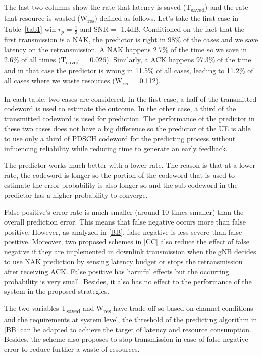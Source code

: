 \documentclass[conference]{IEEEtran}
\begin{document}
The last two columns show the rate that latency is saved (T\textsubscript{saved}) and the rate that resource is wasted (W\textsubscript{res}) defined as follows. Let's take the first case in Table~\ref{tab1} wih $r_{p}$ = $\frac{1}{3}$ and SNR = -1.4dB. Conditioned on the fact that the first transmission is a NAK, the predictor is right in 98\% of the cases and we save latency on the retransmission. A NAK happens 2.7\% of the time so we save in 2.6\% of all times (T\textsubscript{saved} = 0.026). Similarly, a ACK happens 97.3\% of the time and in that case the predictor is wrong in 11.5\% of all cases, leading to 11.2\% of all cases where we waste resources (W\textsubscript{res} = 0.112).

In each table, two cases are considered. In the first case, a half of the transmitted codeword is used to estimate the outcome. In the other case, a third of the transmitted codeword is used for prediction. The performance of the predictor in these two cases does not have a big difference so the predictor of the UE is able to use only a third of PDSCH codeword for the predicting process without influencing reliability while reducing time to generate an early feedback.

The predictor works much better with a lower rate. The reason is that at a lower rate, the codeword is longer so the portion of the codeword that is used to estimate the error probability is also longer so and the sub-codeword in the predictor has a higher probability to converge.

False positive's error rate is much smaller (around 10 times smaller) than the overall prediction error. This means that false negative occurs more than false positive. However, as analyzed in \ref{BB}, false negative is less severe than false positive. Moreover, two proposed schemes in \ref{CC} also reduce the effect of false negative if they are implemented in downlink transmission when the gNB decides to use NAK prediction by sensing latency budget or stops the retransmission after receiving ACK. False positive has harmful effects but the occurring probability is very small. Besides, it also has no effect to the performance of the system in the proposed strategies. 

The two variables T\textsubscript{saved} and W\textsubscript{res} have trade-off so based on channel conditions and the requirements at system level, the threshold of the predicting algorithm in \ref{BB} can be adapted to achieve the target of latency and resource consumption. Besides, the scheme also proposes to stop transmission in case of false negative error to reduce further a waste of resources.
\end{document}
